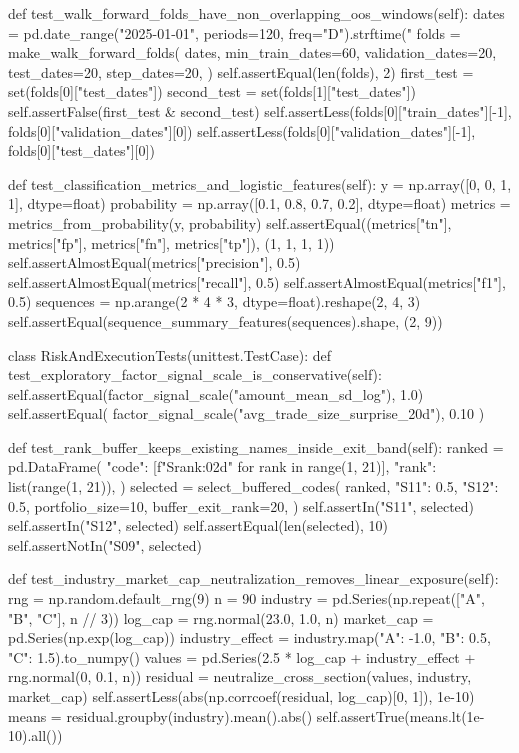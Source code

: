 \documentclass[UTF8,a4paper,fontset=fandol]{ctexart}
\begin{document}
\begin{ProjectCode}
    def test_walk_forward_folds_have_non_overlapping_oos_windows(self):
        dates = pd.date_range("2025-01-01", periods=120, freq="D").strftime("%
        folds = make_walk_forward_folds(
            dates,
            min_train_dates=60,
            validation_dates=20,
            test_dates=20,
            step_dates=20,
        )
        self.assertEqual(len(folds), 2)
        first_test = set(folds[0]["test_dates"])
        second_test = set(folds[1]["test_dates"])
        self.assertFalse(first_test & second_test)
        self.assertLess(folds[0]["train_dates"][-1], folds[0]["validation_dates"][0])
        self.assertLess(folds[0]["validation_dates"][-1], folds[0]["test_dates"][0])

    def test_classification_metrics_and_logistic_features(self):
        y = np.array([0, 0, 1, 1], dtype=float)
        probability = np.array([0.1, 0.8, 0.7, 0.2], dtype=float)
        metrics = metrics_from_probability(y, probability)
        self.assertEqual((metrics["tn"], metrics["fp"], metrics["fn"], metrics["tp"]), (1, 1, 1, 1))
        self.assertAlmostEqual(metrics["precision"], 0.5)
        self.assertAlmostEqual(metrics["recall"], 0.5)
        self.assertAlmostEqual(metrics["f1"], 0.5)
        sequences = np.arange(2 * 4 * 3, dtype=float).reshape(2, 4, 3)
        self.assertEqual(sequence_summary_features(sequences).shape, (2, 9))


class RiskAndExecutionTests(unittest.TestCase):
    def test_exploratory_factor_signal_scale_is_conservative(self):
        self.assertEqual(factor_signal_scale("amount_mean_sd_log"), 1.0)
        self.assertEqual(
            factor_signal_scale("avg_trade_size_surprise_20d"), 0.10
        )

    def test_rank_buffer_keeps_existing_names_inside_exit_band(self):
        ranked = pd.DataFrame({
            "code": [f"S{rank:02d}" for rank in range(1, 21)],
            "rank": list(range(1, 21)),
        })
        selected = select_buffered_codes(
            ranked,
            {"S11": 0.5, "S12": 0.5},
            portfolio_size=10,
            buffer_exit_rank=20,
        )
        self.assertIn("S11", selected)
        self.assertIn("S12", selected)
        self.assertEqual(len(selected), 10)
        self.assertNotIn("S09", selected)

    def test_industry_market_cap_neutralization_removes_linear_exposure(self):
        rng = np.random.default_rng(9)
        n = 90
        industry = pd.Series(np.repeat(["A", "B", "C"], n // 3))
        log_cap = rng.normal(23.0, 1.0, n)
        market_cap = pd.Series(np.exp(log_cap))
        industry_effect = industry.map({"A": -1.0, "B": 0.5, "C": 1.5}).to_numpy()
        values = pd.Series(2.5 * log_cap + industry_effect + rng.normal(0, 0.1, n))
        residual = neutralize_cross_section(values, industry, market_cap)
        self.assertLess(abs(np.corrcoef(residual, log_cap)[0, 1]), 1e-10)
        means = residual.groupby(industry).mean().abs()
        self.assertTrue(means.lt(1e-10).all())


\end{ProjectCode}
\end{document}
